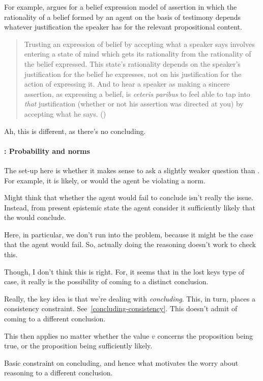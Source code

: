 \begin{note}
  For example, \citeauthor{Owens:2006tw} argues for a belief expression model of assertion in which the rationality of a belief formed by an agent on the basis of testimony depends whatever justification the speaker has for the relevant propositional content.
    \begin{quote}
      Trusting an expression of belief by accepting what a speaker says involves entering a state of mind which gets its rationality from the rationality of the belief expressed.
      This state's rationality depends on the speaker's justification for the belief he expresses, not on his justification for the action of expressing it.
      And to hear a speaker as making a sincere assertion, as expressing a belief, is \emph{ceteris paribus} to feel able to tap into \emph{that} justification (whether or not his assertion was directed at you) by accepting what he says.%
      \mbox{}\hfill\mbox{(\citeyear[123]{Owens:2006tw})}
    \end{quote}
    \color{red}
    Ah, this is different, as there's no concluding.
\end{note}

\paragraph{\zS{}: Probability and norms}

\begin{note}
  The set-up here is whether it makes sense to ask a slightly weaker question than \qzS{}.
  For example, it is likely, or would the agent be violating a norm.
\end{note}

\begin{note}
  Might think that whether the agent would fail to conclude isn't really the issue.
  Instead, from present epistemic state the agent consider it sufficiently likely that the would conclude.

  Here, in particular, we don't run into the \requ{} problem, because it might be the case that the agent would fail.
  So, actually doing the reasoning doesn't work to check this.

  Though, I don't think this is right.
  For, it seems that in the lost keys type of case, it really is the possibility of coming to a distinct conclusion.

  Really, the key idea is that we're dealing with \emph{concluding}.
  This, in turn, places a consistency constraint.
  See~\autoref{concluding-consistency}.
  This doesn't admit of coming to a different conclusion.

  This then applies no matter whether the value \(v\) concerns the proposition being true, or the proposition being sufficiently likely.

  Basic constraint on concluding, and hence what motivates the worry about reasoning to a different conclusion.
\end{note}

